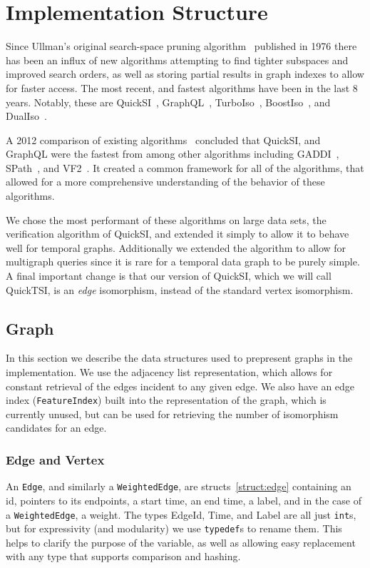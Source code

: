 \section{Implementation Structure}
\label{sec:structure}

Since Ullman's original search-space pruning algorithm~\cite{1976-ACMJ-Ullman}
published in 1976 there has been an influx of new algorithms attempting to find
tighter subspaces and improved search orders, as well as storing partial results
in graph indexes to allow for faster access.  The most recent, and fastest
algorithms have been in the last 8 years. Notably, these are
QuickSI~\cite{2008-VLDB-QuickSI}, GraphQL~\cite{2008-SIGMOD-GraphQL},
TurboIso~\cite{2013-SIGMOD-TurboISO}, BoostIso~\cite{2015-VLDB-BoostIso}, and
DualIso~\cite{2014-IEEE-DualIso}.

A 2012 comparison of existing algorithms~\cite{2012-VLDB-IsoSurvey} concluded
that QuickSI, and GraphQL were the fastest from among other algorithms including
GADDI~\cite{2009-EDBT-GADDI}, SPath~\cite{2010-VLDB-SPath}, and
VF2~\cite{2004-PAMI-VF2}. It created a common framework for all of the
algorithms, that allowed for a more comprehensive understanding of the behavior
of these algorithms.

We chose the most performant of these algorithms on large data sets, the
verification algorithm of QuickSI, and extended it simply to allow it to behave
well for temporal graphs. Additionally we extended the algorithm to allow for
multigraph queries since it is rare for a temporal data graph to be purely
simple. A final important change is that our version of QuickSI, which we will
call QuickTSI, is an \textit{edge} isomorphism, instead of the standard vertex
isomorphism.

\subsection{Graph}

In this section we describe the data structures used to prepresent graphs in the
implementation. We use the adjacency list representation, which allows for
constant retrieval of the edges incident to any given edge. We also have an edge
index (\texttt{FeatureIndex}) built into the representation of the graph, which
is currently unused, but can be used for retrieving the number of isomorphism
candidates for an edge.

\subsubsection{Edge and Vertex}
An \texttt{Edge}, and similarly a \texttt{WeightedEdge}, are
structs~\ref{struct:edge} containing an id, pointers to its endpoints, a start
time, an end time, a label, and in the case of a \texttt{WeightedEdge}, a
weight. The types EdgeId, Time, and Label are all just \texttt{int}s, but for
expressivity (and modularity) we use \texttt{typedef}s to rename them. This
helps to clarify the purpose of the variable, as well as allowing easy
replacement with any type that supports comparison and hashing.

